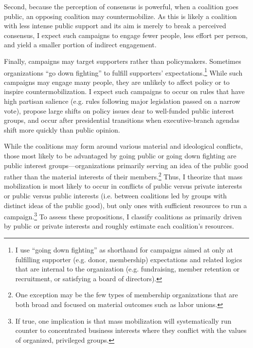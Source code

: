 Second, because the perception of consensus is powerful, when a coalition goes public, an opposing coalition may countermobilize. As this is likely a coalition with less intense public support and its aim is merely to break a perceived consensus, I expect such campaigns to engage fewer people, less effort per person, and yield a smaller portion of indirect engagement. 

Finally, campaigns may target supporters rather than policymakers. Sometimes organizations ``go down fighting'' to fulfill supporters' expectations.\footnote{
I use ``going down fighting'' as shorthand for campaigns aimed at only at fulfilling supporter (e.g. donor, membership) expectations and related logics that are internal to the organization (e.g. fundraising, member retention or recruitment, or satisfying a board of directors).} While such campaigns may engage many people, they are unlikely to affect policy or to inspire countermobilization. I expect such campaigns to occur on rules that have high partisan salience (e.g. rules following major legislation passed on a narrow vote), propose large shifts on policy issues dear to well-funded public interest groups, and occur after presidential transitions when executive-branch agendas shift more quickly than public opinion.

While the coalitions may form around various material and ideological conflicts, those most likely to be advantaged by going public or going down fighting are public interest groups---organizations primarily serving an idea of the public good rather than the material interests of their members.\footnote{
One exception may be the few types of membership organizations that are both broad and focused on material outcomes such as labor unions.} Thus, I theorize that mass mobilization is most likely to occur in conflicts of public versus private interests or public versus public interests (i.e. between coalitions led by groups with distinct ideas of the public good), but only ones with sufficient resources to run a campaign.\footnote{
If true, one implication is that mass mobilization will systematically run counter to concentrated business interests where they conflict with the values of organized, privileged groups.
}
To assess these propositions, I classify coalitions as primarily driven by public or private interests and roughly estimate each coalition's resources. 




